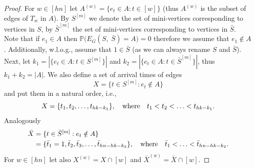 \documentclass[runningheads, envcountsame, smallextended]{llncs}
\newcommand{\pr}{{\mathbb P}}
\numberwithin{theorem}{section}
\numberwithin{definition}{section}
\numberwithin{lemma}{section}
\numberwithin{corollary}{section}
\numberwithin{proposition}{section}
\numberwithin{conjecture}{section}
\numberwithin{remark}{section}
\numberwithin{equation}{section}
\begin{document}
\begin{proof} 
	For $w \in [hn]$ let $A^{(w)} = \{e_t \in A: t \in [w]\}$ (thus $A^{(w)}$ is the subset of edges of $T_w$ in $A$). By $S^{[m]}$ we denote the set of mini-vertices corresponding to vertices in $S$, by $\bar{S}^{[m]}$ the set of mini-vertices corresponding to vertices in $\bar{S}$. %
	Note that if $e_1 \in A$ then $\pr\Big( E_{G}(S, \; \bar{S}) = A \Big) = 0$ therefore we assume that $e_1 \notin A$. Additionally, w.l.o.g., assume that $1 \in \bar{S}$ (as we can always rename $S$ and $\bar{S}$).
	Next, let $k_1 = |\{e_t \in A: t \in S^{[m]}\}|$ 
    and $k_2 = |\{e_t \in A: t \in \bar{S}^{[m]}\}|$, thus $k_1 + k_2 = |A|$. We also define a set of arrival times of edges 
	\[
	X=\{t \in S^{[m]} : e_t \notin A\}
	\]
	and put them in a natural order, i.e.,
	\[
	X = \{t_1, t_2, \ldots, t_{hk-k_1}\}, \quad \textnormal{where} \quad  t_1 < t_2< \ldots < t_{hk-k_1}.
	\]
	Analogously
	\[
	\begin{split}
		\bar{X} & =\{t\in \bar{S}^{[m]} : e_t \notin A \} \\
		& = \{\bar{t}_1 = 1, \bar{t}_2, \bar{t}_3, \ldots, \bar{t}_{hn-hk-k_2}\}, \quad \textnormal{where} \quad \bar{t}_1 < \ldots < \bar{t}_{hn-hk-k_2}.
	\end{split}
	\]
	For $w \in [hn]$ let also $X^{(w)} = X\cap [w]$ and  $\bar{X}^{(w)} = \bar{X}\cap [w]$.
	

\end{proof}
\end{document}
